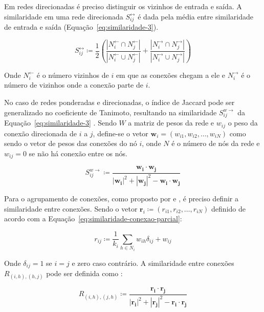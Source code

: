 \documentclass[12pt,a4paper]{article}
\theoremstyle{hypo}
\renewcommand\vec{\mathbf} %
\newcommand{\defn}{\coloneqq} %
\newcommand{\linkin}[1]{#1^\leftarrow} %
\newcommand{\linkout}[1]{#1^\rightarrow} %
\newcommand{\linkboth}[1]{#1^\leftrightarrow} %
\newcommand{\weighteddir}[1]{#1^{w\rightarrow}} %
\begin{document}
Em redes direcionadas é preciso distinguir os vizinhos de entrada e saída. A similaridade em uma rede direcionada $\linkboth{S}_{ij}$ é dada pela média entre similaridade de entrada e saída (Equação~\ref{eq:similaridade-3}).

\begin{equation} \label{eq:similaridade-3}
    \linkboth{S}_{ij} \defn \frac{1}{2} \left( \frac{|\linkin{N}_i \cap \linkin{N}_j|}{|\linkin{N}_i \cup \linkin{N}_j|} + \frac{|\linkout{N}_i \cap \linkout{N}_j|}{|\linkout{N}_i \cup \linkout{N}_j|} \right)
\end{equation}

Onde $\linkin{N}_i$ é o número vizinhos de $i$ em que as conexões chegam a ele e $\linkout{N}_i$ é o número de vizinhos onde a conexão parte de $i$.

No caso de redes ponderadas e direcionadas, o índice de Jaccard pode ser generalizado no coeficiente de Tanimoto, resultando na similaridade $\weighteddir{S}_{ij}$ da Equação~\ref{eq:similaridade-3} \cite{Ahn2010-uh}. Sendo $W$ a matriz de pesos da rede e $w_{ij}$ o peso da conexão direcionada de $i$ a $j$, define-se o vetor $\vec{w}_i = (w_{i1},w_{i2},\ldots,w_{iN})$ como sendo o vetor de pesos das conexões do nó $i$, onde $N$ é o número de nós da rede e $w_{ij} = 0$ se não há conexão entre os nós.

\begin{equation}
\weighteddir{S}_{ij} \defn \frac{\vec{w_i} \cdot \vec{w_j}}{|\vec{w_i}|^2 + |\vec{w_j}|^2 - \vec{w_i} \cdot \vec{w_j}}
\end{equation}

Para o agrupamento de conexões, como proposto por  e , é preciso definir a similaridade entre conexões. Sendo o vetor $\vec{r}_{i} \defn (r_{i1}, r_{i2}, \ldots, r_{iN})$ definido de acordo com a Equação~\ref{eq:similaridade-conexao-parcial}:

\begin{equation} \label{eq:similaridade-conexao-parcial}
r_{ij} \defn \frac{1}{k_i} \sum_{h \in N_i} w_{ih}\delta_{ij} + w_{ij}
\end{equation}

Onde $\delta_{ij} = 1$ se $i = j$ e zero caso contrário. A similaridade entre conexões $R_{(i,h),(h,j)}$ pode ser definida como \cite{Ahn2010-uh}:

\begin{equation}
R_{(i,h),(j,h)} \defn \frac{\vec{r_i} \cdot \vec{r_j}}{|\vec{r_i}|^2 + |\vec{r_j}|^2 -  \vec{r_i} \cdot \vec{r_j}}
\end{equation}
\end{document}
